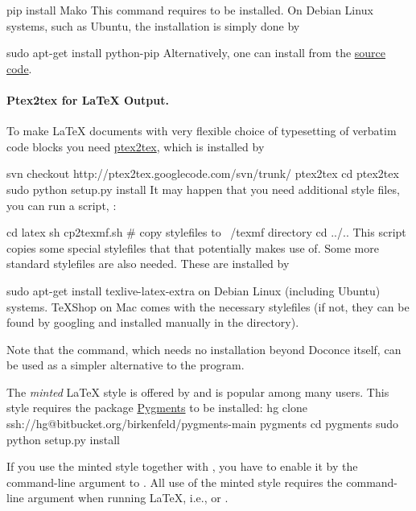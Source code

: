 \documentclass[twoside]{book}
\begin{document}
\bsys
pip install Mako
\esys
This command requires  to be installed. On Debian Linux systems,
such as Ubuntu, the installation is simply done by

\bsys
sudo apt-get install python-pip
\esys
Alternatively, one can install from the  \href{{http://pypi.python.org/pypi/pip}}{source code}.

\paragraph{Ptex2tex for {\LaTeX} Output.}
To make {\LaTeX} documents with very flexible choice of typesetting of
verbatim code blocks you need \href{{http://code.google.com/p/ptex2tex}}{ptex2tex},
which is installed by

\bsys
svn checkout http://ptex2tex.googlecode.com/svn/trunk/ ptex2tex
cd ptex2tex
sudo python setup.py install
\esys
It may happen that you need additional style files, you can run
a script, :

\bsys
cd latex
sh cp2texmf.sh  # copy stylefiles to ~/texmf directory
cd ../..
\esys
This script copies some special stylefiles that
that  potentially makes use of. Some more standard stylefiles
are also needed. These are installed by

\bsys
sudo apt-get install texlive-latex-extra
\esys
on Debian Linux (including Ubuntu) systems. TeXShop on Mac comes with
the necessary stylefiles (if not, they can be found by googling and installed
manually in the  directory).

Note that the  command, which needs no installation
beyond Doconce itself, can be used as a simpler alternative to the 
program.

The \emph{minted} {\LaTeX} style is offered by  and 
is popular among many
users. This style requires the package \href{{http://pygments.org}}{Pygments}
to be installed:
\bsys
hg clone ssh://hg@bitbucket.org/birkenfeld/pygments-main pygments
cd pygments
sudo python setup.py install
\esys

If you use the minted style together with , you have to
enable it by the  command-line argument to .  All
use of the minted style requires the  command-line
argument when running {\LaTeX}, i.e.,  or .

\end{document}
